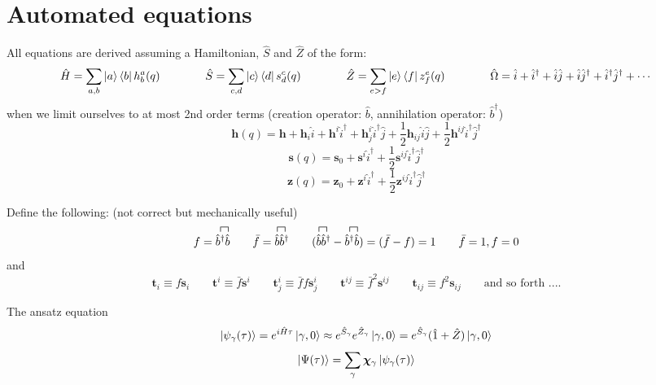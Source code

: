 \documentclass{article}
\newcommand{\bh}{\textbf{h}}
\newcommand{\bt}{\textbf{t}}
\newcommand{\bs}{\textbf{s}}
\newcommand{\bz}{\textbf{z}}
\newcommand{\up}[1]{\hat{#1}^{\dagger}}
\newcommand{\down}[1]{\hat{#1}}
\begin{document}
%
%
%
%
\section{Automated equations}
All equations are derived assuming a Hamiltonian, $\hat{S}$ and $\hat{Z}$ of the form:
\begin{equation}
    \hat{H} = \sum_{a,b} \ket{a}\bra{b}h^{a}_{b}(q)
\qquad\qquad
    \hat{S} = \sum_{c,d} \ket{c}\bra{d}s^{c}_{d}(q)
\qquad\qquad
    \hat{Z} = \sum_{e>f} \ket{e}\bra{f}z^{e}_{f}(q)
\qquad\qquad
    \hat{\Omega} = \down{i} + \up{i} + \down{i}\down{j} + \down{i}\up{j} + \up{i}\up{j} + \cdots
\end{equation}
when we limit ourselves to at most 2nd order terms (creation operator: $\down{b}$, annihilation operator: $\up{b}$)
\begin{equation}
    \bh(q) = \bh + \bh_{i}\down{i} + \bh^{i}\up{i} + \bh^{i}_{j}\up{i}\down{j} + \frac{1}{2}\bh_{ij}\down{i}\down{j} + \frac{1}{2}\bh^{ij}\up{i}\up{j}
\end{equation}
\begin{equation}
    \bs(q) = \bs_{0} + \bs^{i}\up{i} + \frac{1}{2}\bs^{ij}\up{i}\up{j}
\end{equation}
\begin{equation}
    \bz(q) = \bz_{0} + \bz^{i}\up{i} + \frac{1}{2}\bz^{ij}\up{i}\up{j}
\end{equation}

Define the following: (not correct but mechanically useful)
\begin{equation}
    f = \contraction[1ex]{}{\up{b}}{}{\down{b}}\up{b}\down{b}
\qquad
    \bar{f} = \contraction[1ex]{}{\down{b}}{}{\up{b}}\down{b}\up{b}
\qquad
    (
    \contraction[1ex]{}{\down{b}}{}{\up{b}}\down{b}\up{b}
    -
    \contraction[1ex]{}{\up{b}}{}{\down{b}}\up{b}\down{b}
    )
    = (\bar{f} - f) = 1
\qquad
    \bar{f} = 1, f = 0
\end{equation}
and
\begin{equation}
    \bt_{i} \equiv f\bs_{i}
\qquad
    \bt^{i} \equiv \bar{f}\bs^{i}
\qquad
    \bt^{i}_{j} \equiv \bar{f}f\bs^{i}_{j}
\qquad
    \bt^{ij} \equiv \bar{f}^2\bs^{ij}
\qquad
    \bt_{ij} \equiv f^2\bs_{ij}
\qquad
    \text{and so forth ....}
\end{equation}


The ansatz equation
\begin{equation}
    \ket{\psi_{\gamma}(\tau)}
    = e^{i\hat{H}\tau}\ket{\gamma,0}
%
    \approx e^{\hat{S}_{\gamma}}e^{\hat{Z}_{\gamma}}\ket{\gamma,0}
%
    = e^{\hat{S}_{\gamma}}(\hat{1}+\hat{Z})\ket{\gamma,0}
\end{equation}
\begin{equation}
    \ket{\Psi(\tau)} = \sum_{\gamma}\bm{\chi}_\gamma\ket{\psi_{\gamma}(\tau)}
\end{equation}
\end{document}
